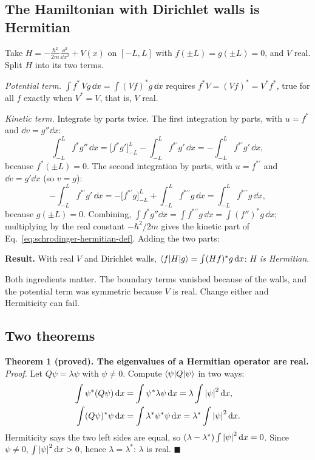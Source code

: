 \subsection{The Hamiltonian with Dirichlet walls is Hermitian}

Take $H=-\frac{\hbar^2}{2m}\frac{\dd^2}{\dd x^2}+V(x)$ on $[-L,L]$ with $f(\pm L)=g(\pm L)=0$, and $V$ real. Split $H$ into its two terms.

\emph{Potential term.} $\int f^*\,Vg\,\dd x=\int (Vf)^*g\,\dd x$ requires $f^*V=(Vf)^*=V^*f^*$, true for all $f$ exactly when $V^*=V$, that is, $V$ real.

\emph{Kinetic term.} Integrate by parts twice. The first integration by parts, with $u=f^*$ and $\dd v=g''\dd x$:
\[
\int_{-L}^Lf^*g''\,\dd x=\Big[f^*g'\Big]_{-L}^L-\int_{-L}^Lf^{*\prime}g'\,\dd x=-\int_{-L}^Lf^{*\prime}g'\,\dd x,
\]
because $f^*(\pm L)=0$. The second integration by parts, with $u=f^{*\prime}$ and $\dd v=g'\dd x$ (so $v=g$):
\[
-\int_{-L}^Lf^{*\prime}g'\,\dd x=-\Big[f^{*\prime}g\Big]_{-L}^L+\int_{-L}^Lf^{*\prime\prime}g\,\dd x=\int_{-L}^Lf^{*\prime\prime}g\,\dd x,
\]
because $g(\pm L)=0$. Combining, $\int f^*g''\dd x=\int f^{*\prime\prime}g\,\dd x=\int(f'')^*g\,\dd x$; multiplying by the real constant $-\hbar^2/2m$ gives the kinetic part of Eq.~\eqref{eq:schrodinger-hermitian-def}. Adding the two parts:

\medskip
\noindent\textbf{Result.} With real $V$ and Dirichlet walls, $\langle f|H|g\rangle=\int(Hf)^*g\,\mathrm{d} x$: \emph{$H$ is Hermitian}.
\medskip

Both ingredients matter. The boundary terms vanished because of the walls, and the potential term was symmetric because $V$ is real. Change either and Hermiticity can fail.

\subsection{Two theorems}

\noindent\textbf{Theorem 1 (proved). The eigenvalues of a Hermitian operator are real.}
\emph{Proof.} Let $Q\psi=\lambda\psi$ with $\psi\neq0$. Compute $\langle \psi| Q|\psi\rangle$ in two ways:
\begin{align*}
\int\psi^*(Q\psi)\,\mathrm{d} x&=\int\psi^*\lambda\psi\,\mathrm{d} x=\lambda\int\left\lvert \psi\right\rvert^2\mathrm{d} x,\\
\int(Q\psi)^*\psi\,\mathrm{d} x&=\int\lambda^*\psi^*\psi\,\mathrm{d} x=\lambda^*\int\left\lvert \psi\right\rvert^2\mathrm{d} x.
\end{align*}
Hermiticity says the two left sides are equal, so $(\lambda-\lambda^*)\int\left\lvert \psi\right\rvert^2\mathrm{d} x=0$. Since $\psi\ne0$, $\int\left\lvert \psi\right\rvert^2\mathrm{d} x>0$, hence $\lambda=\lambda^*$: $\lambda$ is real. $\blacksquare$

